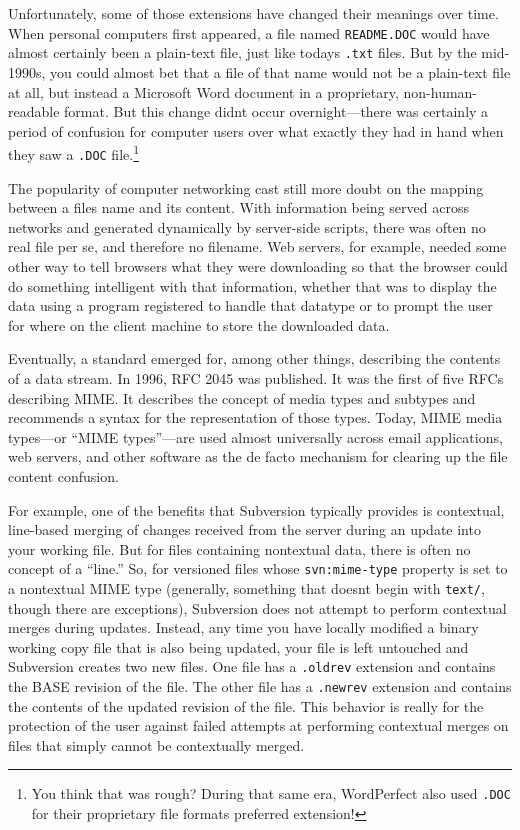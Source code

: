 Unfortunately, some of those extensions have changed their meanings over
time. When personal computers first appeared, a file named
\texttt{README.DOC} would have almost certainly been a plain-text file,
just like today\textquotesingle s \texttt{.txt} files. But by the
mid-1990s, you could almost bet that a file of that name would not be a
plain-text file at all, but instead a Microsoft Word document in a
proprietary, non-human-readable format. But this change
didn\textquotesingle t occur overnight---there was certainly a period of
confusion for computer users over what exactly they had in hand when
they saw a \texttt{.DOC} file.\footnote{You think that was rough? During
  that same era, WordPerfect also used \texttt{.DOC} for their
  proprietary file format\textquotesingle s preferred extension!}

The popularity of computer networking cast still more doubt on the
mapping between a file\textquotesingle s name and its content. With
information being served across networks and generated dynamically by
server-side scripts, there was often no real file per se, and therefore
no filename. Web servers, for example, needed some other way to tell
browsers what they were downloading so that the browser could do
something intelligent with that information, whether that was to display
the data using a program registered to handle that datatype or to prompt
the user for where on the client machine to store the downloaded data.

Eventually, a standard emerged for, among other things, describing the
contents of a data stream. In 1996, RFC 2045 was published. It was the
first of five RFCs describing MIME. It describes the concept of media
types and subtypes and recommends a syntax for the representation of
those types. Today, MIME media types---or ``MIME types''---are used
almost universally across email applications, web servers, and other
software as the de facto mechanism for clearing up the file content
confusion.

For example, one of the benefits that Subversion typically provides is
contextual, line-based merging of changes received from the server
during an update into your working file. But for files containing
nontextual data, there is often no concept of a ``line.'' So, for
versioned files whose \texttt{svn:mime-type} property is set to a
nontextual MIME type (generally, something that doesn\textquotesingle t
begin with \texttt{text/}, though there are exceptions), Subversion does
not attempt to perform contextual merges during updates. Instead, any
time you have locally modified a binary working copy file that is also
being updated, your file is left untouched and Subversion creates two
new files. One file has a \texttt{.oldrev} extension and contains the
BASE revision of the file. The other file has a \texttt{.newrev}
extension and contains the contents of the updated revision of the file.
This behavior is really for the protection of the user against failed
attempts at performing contextual merges on files that simply cannot be
contextually merged.

